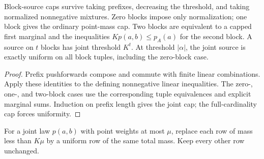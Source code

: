 \begin{theorem}
  \label{thm:lowerbounds-algebraic-block-source-structure}
  \leanok
  Block-source caps survive taking prefixes, decreasing the threshold,
  and taking normalized nonnegative mixtures. Zero blocks impose only
  normalization; one block gives the ordinary point-mass cap. Two blocks
  are equivalent to a capped first marginal and the inequalities
  $Kp(a,b)\le p_A(a)$ for the second block. A source on $t$ blocks has
  joint threshold $K^t$. At threshold $|\alpha|$, the joint source is
  exactly uniform on all block tuples, including the zero-block case.
\end{theorem}
\begin{proof}
  \leanok
  Prefix pushforwards compose and commute with finite linear combinations.
  Apply these identities to the defining nonnegative linear inequalities.
  The zero-, one-, and two-block cases use the corresponding tuple
  equivalences and explicit marginal sums. Induction on prefix length
  gives the joint cap; the full-cardinality cap forces uniformity.
\end{proof}

\begin{definition}
  \label{def:lowerbounds-algebraic-two-block-repair}
  \leanok
  For a joint law $p(a,b)$ with point weights at most $\mu$, replace each
  row of mass less than $K\mu$ by a uniform row of the same total mass.
  Keep every other row unchanged.
\end{definition}

